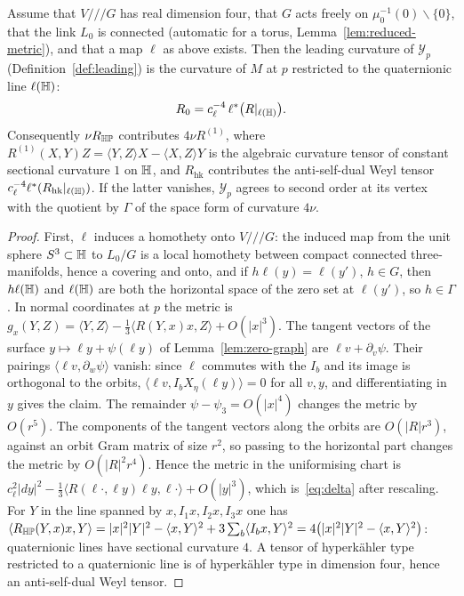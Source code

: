 \begin{proposition}\label{prop:universal}
Assume that $V/\!/\!/G$ has real dimension four, that $G$ acts freely on $\mu_0^{-1}(0)\smallsetminus\{0\}$,
that the link $L_0$ is connected (automatic for a torus, Lemma~\ref{lem:reduced-metric}), and that a map
$\ell$ as above exists. Then the leading curvature of $\mathcal Y_p$ (Definition~\ref{def:leading}) is the curvature of $M$
at $p$ restricted to the quaternionic line $\ell(\mathbb H)$:
\begin{equation}
 R_0=c_\ell^{-4}\,\ell^*\bigl(R|_{\ell(\mathbb H)}\bigr).
 \label{eq:delta}
\end{equation}
Consequently $\nu R_{\mathbb H\mathbb P}$ contributes $4\nu R^{(1)}$, where $R^{(1)}(X,Y)Z=\langle Y,Z\rangle X-\langle X,Z\rangle Y$
is the algebraic curvature tensor of constant sectional curvature $1$ on $\mathbb H$, and $R_{\mathrm{hk}}$ contributes the anti-self-dual Weyl tensor
$c_\ell^{-4}\ell^*(R_{\mathrm{hk}}|_{\ell(\mathbb H)})$. If the latter vanishes, $\mathcal Y_p$ agrees to second order
at its vertex with the quotient by $\Gamma$ of the space form of curvature $4\nu$.
\end{proposition}

\begin{proof}
First, $\ell$ induces a homothety onto $V/\!/\!/G$: the induced map from the unit sphere $S^3\subset\mathbb H$ to
$L_0/G$ is a local homothety between compact connected three-manifolds, hence a covering and onto, and if
$h\ell(y)=\ell(y')$, $h\in G$, then $h\ell(\mathbb H)$ and $\ell(\mathbb H)$ are both the horizontal space of the zero set
at $\ell(y')$, so $h\in\Gamma$. In normal coordinates at $p$ the metric is
$g_x(Y,Z)=\langle Y,Z\rangle-\tfrac13\langle R(Y,x)x,Z\rangle+O(|x|^3)$. The tangent vectors of the surface
$y\mapsto\ell y+\psi(\ell y)$ of Lemma~\ref{lem:zero-graph} are $\ell v+\partial_v\psi$. Their pairings
$\langle\ell v,\partial_w\psi\rangle$ vanish: since $\ell$ commutes with the $I_b$ and its image is orthogonal to
the orbits, $\langle\ell v,I_bX_\eta(\ell y)\rangle=0$ for all $v,y$, and differentiating in $y$ gives the
claim. The remainder $\psi-\psi_3=O(|x|^4)$ changes the metric by $O(r^5)$. The components of the tangent vectors
along the orbits are $O(|R|r^3)$, against an orbit Gram matrix of size $r^2$, so passing to the horizontal
part changes the metric by $O(|R|^2r^4)$. Hence the metric in the uniformising chart is
$c_\ell^2|dy|^2-\tfrac13\langle R(\ell\cdot,\ell y)\ell y,\ell\cdot\rangle+O(|y|^3)$, which is~\eqref{eq:delta}
after rescaling. For $Y$ in the line spanned by $x,I_1x,I_2x,I_3x$ one has
$\langle R_{\mathbb H\mathbb P}(Y,x)x,Y\rangle=|x|^2|Y|^2-\langle x,Y\rangle^2+3\sum_b\langle I_bx,Y\rangle^2
=4\bigl(|x|^2|Y|^2-\langle x,Y\rangle^2\bigr)$: quaternionic lines have sectional curvature $4$. A tensor of
hyperk\"ahler type restricted to a quaternionic line is of hyperk\"ahler type in dimension four, hence an
anti-self-dual Weyl tensor.
\end{proof}

